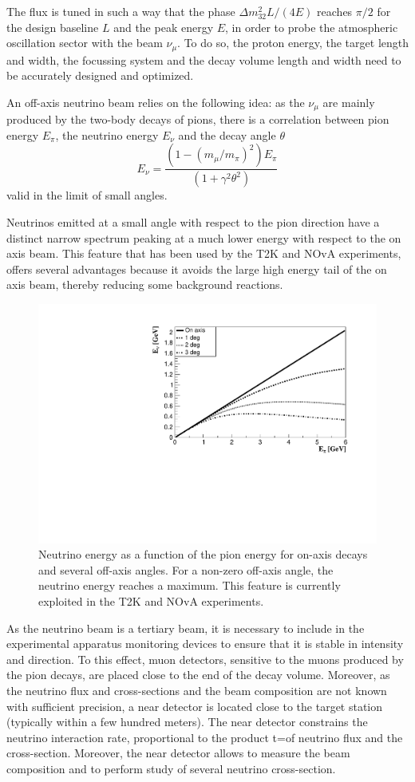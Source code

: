 \documentclass[preprint,12pt]{elsarticle}
\begin{document}
The flux is tuned in such a way that the phase $\Delta m^2_{32} L/ (4 E)$ reaches $\pi/2$ for the design baseline $L$ and the peak energy $E$, in order to probe the atmospheric oscillation sector with the beam $\nu_\mu$. To do so, the proton energy, the target length and width, the focussing system and the decay volume length and width need to be accurately designed and optimized.   

An off-axis neutrino beam \cite{ref:beavis} relies on the following idea: as the $\nu_\mu$ are mainly produced by the two-body decays of pions, there is a correlation between pion energy $E_\pi$, the neutrino energy $E_\nu$ and the decay angle $\theta$ 
\begin{equation}
E_\nu = \frac{(1-(m_\mu/m_\pi)^2) E_\pi}{(1+\gamma^2 \theta^2) } 
\end{equation}
valid in the limit of small angles.

Neutrinos emitted at a small angle with respect to the pion direction have a distinct narrow spectrum peaking at a much lower energy with respect to the on axis beam. This feature that has been used by the T2K and NOvA experiments, offers several advantages because it avoids the large high energy tail of the on axis beam, thereby reducing some background reactions. 

\begin{figure}[htbp]
\centering
\includegraphics[width=0.6\linewidth]{figures/offaxis.pdf}
  \caption{Neutrino energy as a function of the pion energy for on-axis decays and several off-axis angles. For a non-zero off-axis angle, the neutrino energy reaches a maximum. This feature is currently exploited in the T2K and NOvA experiments.}
 \label{fig:offaxis}
 \end{figure}


As the neutrino beam is a tertiary beam, it is necessary to include in the experimental apparatus monitoring devices to ensure that it is stable in intensity and direction. To this effect, muon detectors, sensitive to the muons produced by the pion decays, are placed close to the end of the decay volume. Moreover, as the neutrino flux and cross-sections and the beam composition are not known with sufficient precision, a near detector is located close to the target station (typically within a few hundred meters). The near detector constrains the neutrino interaction rate, proportional to the product t=of neutrino flux and the cross-section. Moreover, the near detector allows to measure the beam composition and to perform study of several neutrino cross-section.    
\end{document}
